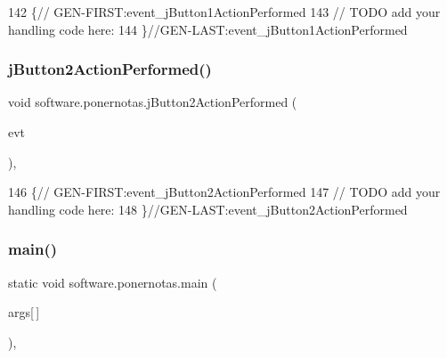 \begin{DoxyCode}
142                                                                          \{\textcolor{comment}{//
      GEN-FIRST:event\_jButton1ActionPerformed}
143         \textcolor{comment}{// TODO add your handling code here:}
144     \}\textcolor{comment}{//GEN-LAST:event\_jButton1ActionPerformed}
\end{DoxyCode}
\mbox{\label{classsoftware_1_1ponernotas_a1b22c329acda989f58386bdfe78f9ff4}} 
\subsubsection{\texorpdfstring{j\+Button2\+Action\+Performed()}{jButton2ActionPerformed()}}
{\footnotesize\ttfamily void software.\+ponernotas.\+j\+Button2\+Action\+Performed (\begin{DoxyParamCaption}\item[{java.\+awt.\+event.\+Action\+Event}]{evt }\end{DoxyParamCaption})\hspace{0.3cm}{\ttfamily [inline]}, {\ttfamily [private]}}


\begin{DoxyCode}
146                                                                          \{\textcolor{comment}{//
      GEN-FIRST:event\_jButton2ActionPerformed}
147         \textcolor{comment}{// TODO add your handling code here:}
148     \}\textcolor{comment}{//GEN-LAST:event\_jButton2ActionPerformed}
\end{DoxyCode}
\mbox{\label{classsoftware_1_1ponernotas_a43c864721c1cde458039646a64ce72c3}} 
\subsubsection{\texorpdfstring{main()}{main()}}
{\footnotesize\ttfamily static void software.\+ponernotas.\+main (\begin{DoxyParamCaption}\item[{String}]{args\mbox{[}$\,$\mbox{]} }\end{DoxyParamCaption})\hspace{0.3cm}{\ttfamily [inline]}, {\ttfamily [static]}}


